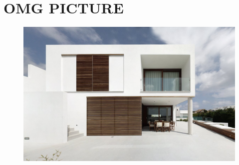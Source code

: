 \section{OMG PICTURE}

\begin{figure}[H]
	\centering
	\includegraphics[width=.7\textwidth]{gfx/modern-minimalist-square-house-menorca-sun-shades-for-the-windows-ideas.jpg}
\end{figure}

